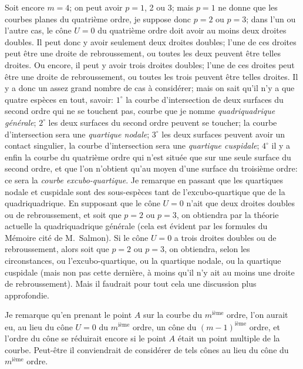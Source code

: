 \documentclass[11pt,a4paper]{article}
\begin{document}
Soit encore $m = 4$; on peut avoir $p = 1$, 2 ou 3; mais $p = 1$ ne donne que les courbes planes du quatri\`{e}me ordre, je suppose donc $p = 2$ ou $p = 3$; dans l'un ou l'autre cas, le c\^{o}ne $U = 0$ du quatri\`{e}me ordre doit avoir au moins deux droites doubles. Il peut donc y avoir seulement deux droites doubles; l'une de ces droites peut \^{e}tre une droite de rebroussement, ou toutes les deux peuvent \^{e}tre telles droites. Ou encore, il peut y avoir trois droites doubles; l'une de ces droites peut \^{e}tre une droite de rebroussement, ou toutes les trois peuvent \^{e}tre telles droites. Il y a donc un assez grand nombre de cas \`{a} consid\'{e}rer; mais on sait qu'il n'y a que quatre esp\`{e}ces en tout, savoir: $1^\circ$ la courbe d'intersection de deux surfaces du second ordre qui ne se touchent pas, courbe que je nomme \textit{quadriquadrique g\'{e}n\'{e}rale}; $2^\circ$ les deux surfaces du second ordre peuvent se toucher; la courbe d'intersection sera une \textit{quartique nodale}; $3^\circ$ les deux surfaces peuvent avoir un contact singulier, la courbe d'intersection sera une \textit{quartique cuspidale}; $4^\circ$ il y a enfin la courbe du quatri\`{e}me ordre qui n'est situ\'{e}e que sur une seule surface du second ordre, et que l'on n'obtient qu'au moyen d'une surface du troisi\`{e}me ordre: ce sera la \textit{courbe excubo-quartique}. Je remarque en passant que les quartiques nodale et cuspidale sont des sous-esp\`{e}ces tant de l'excubo-quartique que de la quadriquadrique. En supposant que le c\^{o}ne $U = 0$ n'ait que deux droites doubles ou de rebroussement, et soit que $p = 2$ ou $p = 3$, on obtiendra par la th\'{e}orie actuelle la quadriquadrique g\'{e}n\'{e}rale (cela est \'{e}vident par les formules du M\'{e}moire cit\'{e} de M.~Salmon). Si le c\^{o}ne $U = 0$ a trois droites doubles ou de rebroussement, alors soit que $p = 2$ ou $p = 3$, on obtiendra, selon les circonstances, ou l'excubo-quartique, ou la quartique nodale, ou la quartique cuspidale (mais non pas cette derni\`{e}re, \`{a} moins qu'il n'y ait au moins une droite de rebroussement). Mais il faudrait pour tout cela une discussion plus approfondie.

Je remarque qu'en prenant le point $A$ sur la courbe du $m^{\text{i\`{e}me}}$ ordre, l'on aurait eu, au lieu du c\^{o}ne $U = 0$ du $m^{\text{i\`{e}me}}$ ordre, un c\^{o}ne du $(m-1)^{\text{i\`{e}me}}$ ordre, et l'ordre du c\^{o}ne se r\'{e}duirait encore si le point $A$ \'{e}tait un point multiple de la courbe. Peut-\^{e}tre il conviendrait de consid\'{e}rer de tels c\^{o}nes au lieu du c\^{o}ne du $m^{\text{i\`{e}me}}$ ordre.
\end{document}
